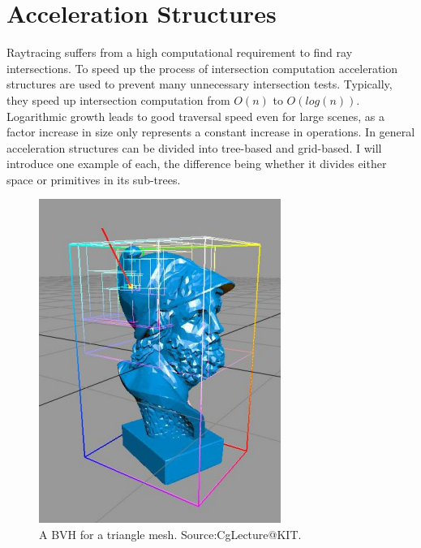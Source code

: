 \section{Acceleration Structures}
Raytracing suffers from a high computational requirement to find ray intersections. To speed up the process of intersection computation acceleration structures are used to prevent many unnecessary intersection tests. Typically, they speed up intersection computation from $O(n)$ to $O(log(n))$. Logarithmic growth leads to good traversal speed even for large scenes, as a factor increase in size only represents a constant increase in operations.
In general acceleration structures can be divided into tree-based and grid-based. I will introduce one example of each, the difference being whether it divides either space or primitives in its sub-trees.
\begin{figure}
    \centering
    \includegraphics[width=.5\textwidth]{images/showcase/CgLectureBVH.PNG}
    \caption{A BVH for a triangle mesh. Source:CgLecture@KIT.}
    \label{fig:cgBVH}
\end{figure}
\newpage
